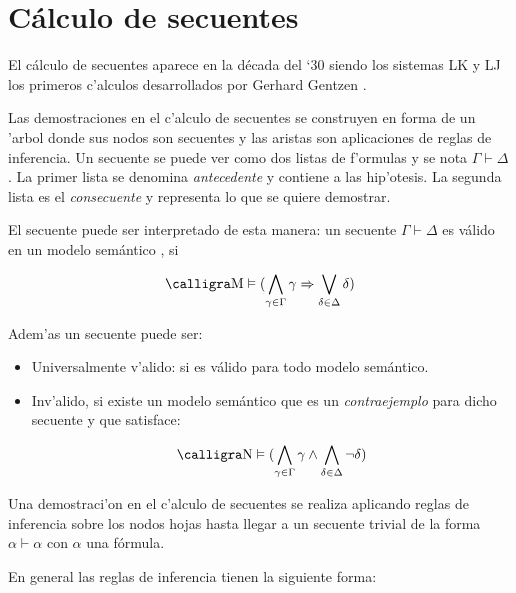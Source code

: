 \section{Cálculo de secuentes} \label{calculo-secuentes}

El cálculo de secuentes aparece en la década del `30 siendo los sistemas LK y LJ los primeros c'alculos desarrollados por Gerhard Gentzen \cite{gentzen1935}.

Las demostraciones en el c'alculo de secuentes se construyen en forma de un 'arbol donde sus nodos son secuentes y las aristas son aplicaciones de reglas de inferencia. Un secuente se puede ver como dos listas de f'ormulas y se nota $ \Gamma \vdash  \Delta$. La primer lista se denomina \textit{antecedente} y contiene a las hip'otesis. La segunda lista es el \textit{consecuente} y representa lo que se quiere demostrar.

El secuente puede ser interpretado de esta manera: un secuente $\Gamma \vdash  \Delta$ es válido en un modelo semántico , si 

\begin{equation}
\textrm{\sem{M}} \vDash (\bigwedge_{\gamma \in \Gamma} \gamma \Rightarrow \bigvee_{\delta \in \Delta} \delta )
\notag
\end{equation}

Adem'as un secuente puede ser:

\begin{itemize}

\item{Universalmente v'alido}: si es válido para todo modelo semántico.
\item{Inv'alido}, si existe un modelo semántico  que es un \emph{contraejemplo} para dicho secuente y que satisface:

\begin{equation}
\textrm{\sem{N}} \vDash (\bigwedge_{\gamma \in \Gamma} \gamma \wedge \bigwedge_{\delta \in \Delta} \neg\delta )
\notag
\end{equation}

\end{itemize}



Una demostraci'on en el c'alculo de secuentes se realiza aplicando reglas de inferencia sobre los nodos hojas hasta llegar a un secuente trivial de la forma $\alpha \vdash \alpha$ con $\alpha$ una fórmula.

En general las reglas de inferencia tienen la siguiente forma:

